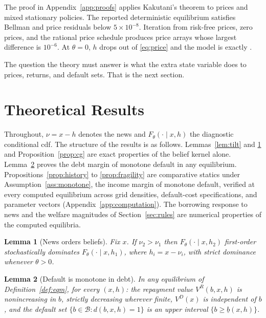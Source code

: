 \documentclass[11pt]{article}
\newtheorem{lemma}{Lemma}
\theoremstyle{definition}
\providecommand{\FPResidual}{$5\times10^{-8}$}
\providecommand{\FPInitDiff}{$10^{-6}$}
\begin{document}
The proof in Appendix~\ref{app:proofs} applies Kakutani's theorem to prices and mixed stationary policies. The reported deterministic equilibrium satisfies Bellman and price residuals below \FPResidual. Iteration from risk-free prices, zero prices, and the rational price schedule produces price arrays whose largest difference is \FPInitDiff. At $\theta = 0$, $h$ drops out of \eqref{eq:price} and the model is exactly \citet{Arellano2008}.

The question the theory must answer is what the extra state variable does to prices, returns, and default sets. That is the next section.

\section{Theoretical Results}\label{sec:theory}

Throughout, $\nu = x - h$ denotes the news and $F_\theta(\cdot \mid x, h)$ the diagnostic conditional cdf. The structure of the results is as follows. Lemmas~\ref{lem:tilt} and \ref{lem:fosd} and Proposition~\ref{prop:cg} are exact properties of the belief kernel alone. Lemma~\ref{lem:bmono} proves the debt margin of monotone default in any equilibrium. Propositions~\ref{prop:history} to \ref{prop:fragility} are comparative statics under Assumption~\ref{ass:monotone}, the income margin of monotone default, verified at every computed equilibrium across grid densities, default-cost specifications, and parameter vectors (Appendix~\ref{app:computation}). The borrowing response to news and the welfare magnitudes of Section~\ref{sec:rules} are numerical properties of the computed equilibria.

\begin{lemma}[News orders beliefs]\label{lem:fosd}
Fix $x$. If $\nu_2 > \nu_1$ then $F_\theta(\cdot \mid x, h_2)$ first-order stochastically dominates $F_\theta(\cdot \mid x, h_1)$, where $h_i = x - \nu_i$, with strict dominance whenever $\theta > 0$.
\end{lemma}

\begin{lemma}[Default is monotone in debt]\label{lem:bmono}
In any equilibrium of Definition~\ref{def:eqm}, for every $(x, h)$: the repayment value $V^R(b, x, h)$ is nonincreasing in $b$, strictly decreasing wherever finite, $V^D(x)$ is independent of $b$, and the default set $\{ b \in \mathcal{B} : d(b, x, h) = 1 \}$ is an upper interval $\{ b \geq \underline b(x,h) \}$.
\end{lemma}
\end{document}
